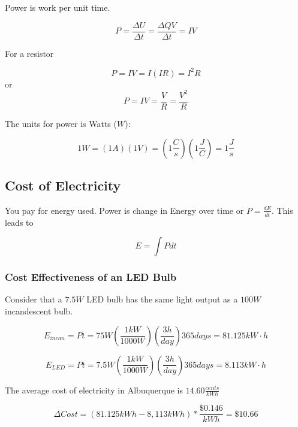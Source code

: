 \documentclass[14pt]{memoir}
\begin{document}
Power is work per unit time.

\begin{equation}
P = \frac{\Delta U}{\Delta t} = \frac{\Delta Q V}{\Delta t} = IV
\end{equation}

For a resistor

\begin{equation}
P = IV = I(IR) = I^2R
\end{equation}
or
\begin{equation}
P = IV = \frac{V}{R} = \frac{V^2}{R}
\end{equation}

The units for power is Watts ($W$):

\begin{equation}
1 W = (1 A) (1 V) = (1 \frac{C}{s})(1 \frac{J}{C}) = 1 \frac{J}{s}
\end{equation}

\subsection{Cost of Electricity}

You pay for energy used. Power is change in Energy over time or $P = \frac{dE}{dt}$. This leads to 

\begin{equation}
E = \int P dt
\end{equation}

\subsubsection{Cost Effectiveness of an LED Bulb}

Consider that a $7.5 W$ LED bulb has the same light output as a $100 W$ incandescent bulb.

\begin{equation}
E_{incan} = Pt = 75 W (\frac{1 kW}{1000 W})(\frac{3 h}{day}) 365 days = 81.125 kW \cdot h
\end{equation}

\begin{equation}
E_{LED} = Pt = 7.5 W (\frac{1 kW}{1000 W})(\frac{3 h}{day}) 365 days = 8.113 kW \cdot h
\end{equation}

The average cost of electricity in Albuquerque is $14.60 \frac{cents}{kWh}$

\begin{equation}
\Delta Cost = (81.125 kWh - 8,113 kWh) * \frac{\$0.146}{kWh} = \$10.66
\end{equation}
\end{document}
